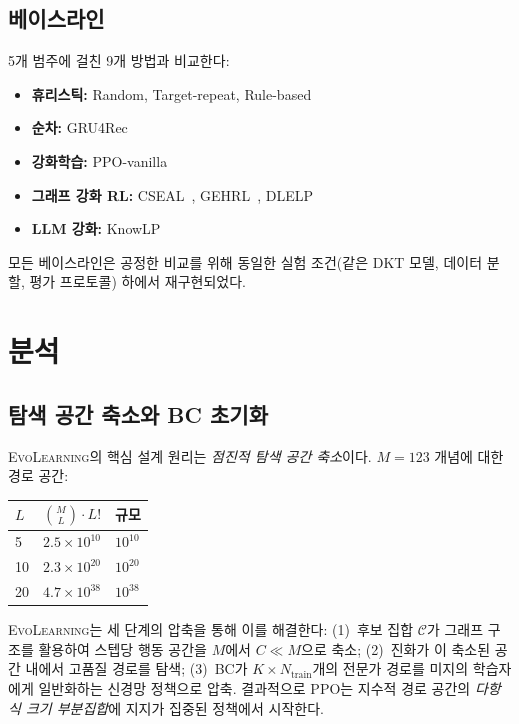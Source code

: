 \documentclass[11pt,a4paper]{article}
\newcommand{\ours}{\textsc{EvoLearning}}
\begin{document}
\subsection{베이스라인}

5개 범주에 걸친 9개 방법과 비교한다:
\begin{itemize}
    \item \textbf{휴리스틱:} Random, Target-repeat, Rule-based
    \item \textbf{순차:} GRU4Rec~\cite{hidasi2016gru4rec}
    \item \textbf{강화학습:} PPO-vanilla~\cite{schulman2017ppo}
    \item \textbf{그래프 강화 RL:} CSEAL~\cite{liu2019cseal}, GEHRL~\cite{li2023gehrl}, DLELP~\cite{cheng2025knowlp}
    \item \textbf{LLM 강화:} KnowLP~\cite{cheng2025knowlp}
\end{itemize}

모든 베이스라인은 공정한 비교를 위해 동일한 실험 조건(같은 DKT 모델, 데이터 분할, 평가 프로토콜) 하에서 재구현되었다.

\section{분석}

\subsection{탐색 공간 축소와 BC 초기화}

\ours{}의 핵심 설계 원리는 \emph{점진적 탐색 공간 축소}이다. $M=123$ 개념에 대한 경로 공간:

\begin{center}
\begin{tabular}{@{}lrl@{}}
\toprule
$L$ & $\binom{M}{L} \cdot L!$ & 규모 \\
\midrule
5 & $2.5 \times 10^{10}$ & $10^{10}$ \\
10 & $2.3 \times 10^{20}$ & $10^{20}$ \\
20 & $4.7 \times 10^{38}$ & $10^{38}$ \\
\bottomrule
\end{tabular}
\end{center}

\ours{}는 세 단계의 압축을 통해 이를 해결한다: (1)~후보 집합 $\mathcal{C}$가 그래프 구조를 활용하여 스텝당 행동 공간을 $M$에서 $C \ll M$으로 축소; (2)~진화가 이 축소된 공간 내에서 고품질 경로를 탐색; (3)~BC가 $K \times N_{\text{train}}$개의 전문가 경로를 미지의 학습자에게 일반화하는 신경망 정책으로 압축. 결과적으로 PPO는 지수적 경로 공간의 \emph{다항식 크기 부분집합}에 지지가 집중된 정책에서 시작한다.
\end{document}
